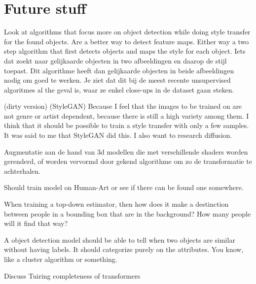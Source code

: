 \chapter{Future stuff}
Look at algorithms that focus more on object detection while doing style transfer for the found objects.
Are a better way to detect feature maps.
Either way a two step algorithm that first detects objects and maps the style for each object.
Iets dat zoekt naar gelijkaarde objecten in two afbeeldingen en daarop de stijl toepast.
Dit algorithme heeft dan gelijkaarde objecten in beide afbeeldingen nodig om goed te werken.
Je ziet dat dit bij de meest recente unsupervised algoritmes al the geval is, waar ze enkel close-ups in de dataset gaan steken.


(dirty version)
(StyleGAN) Because I feel that the images to be trained on are not genre or artist dependent, because there is still a high variety among them.
I think that it should be possible to train a style transfer with only a few samples.
It was said to me that StyleGAN did this.
I also want to research diffusion.

Augmentatie aan de hand van 3d modellen die met verschillende shaders worden gerenderd, of worden vervormd door gekend algorithme om zo de transformatie te achterhalen.

Should train model on Human-Art or see if there can be found one somewhere.

When training a top-down estimator, then how does it make a destinction between people in a bounding box that are in the background?
How many people will it find that way?

A object detection model should be able to tell when two objects are similar without having labels.
It should categorize purely on the attributes.
You know, like a cluster algorithm or something.



Discuss Tuiring completeness of transformers